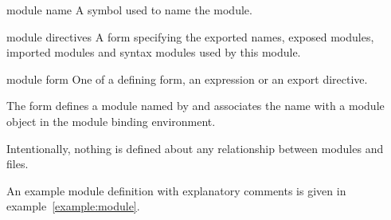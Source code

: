 \begin{optDefinition}
{\begin{syntaxx}
    \end{syntaxx}}
%
%
\begin{arguments}
    \item[module name] A symbol used to name the module.
    \item[module directives] A form specifying the exported names, exposed
    modules, imported modules and syntax modules used by this module.
    \item[module form] One of a defining form, an expression or an export
    directive.
\end{arguments}
%
\remarks%
The  form defines a module named by 
and associates the name  with a module object in the
module binding environment.
\begin{note}
    Intentionally, nothing is defined about any relationship between modules and
    files.
\end{note}
%
\examples
An example module definition with explanatory comments is given in
example~\ref{example:module}.
%
\end{optDefinition}
%
\label{directives}
%

